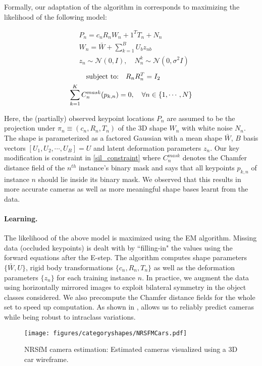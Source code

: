 Formally, our adaptation of the \nrsfm algorithm in \cite{Torresani2008NRSFM} corresponds to maximizing the likelihood of the following model:

\begin{equation}
\begin{aligned}
&{P_{n}} = c_nR_nW_{n} + 1^TT_{n} + N_{n}\\
&W_n = \bar{W} + \sum\limits_{k=1}^B U_b z_{nb} \\
&z_n \sim \mathcal{N}(0,I), \quad N^k_{n}\sim \mathcal{N}(0,\sigma^2 I)
\end{aligned}
\end{equation}
\begin{align}
\text{subject to:}\nonumber &\quad R_nR_{n}^{T} = I_2 \\
\eqlabel{sil_constraint}
\sum\limits_{k=1}^K C_{n}^{mask}(p_{k,n}) &= 0, \quad \forall n\in \{1,\cdots,N\}
\end{align}

Here, the (partially) observed keypoint locations $P_n$ are assumed to be the projection under $\pi_n \equiv (c_n, R_n, T_n)$ of the 3D shape $W_n$ with white noise $N_n$. The shape is parameterized as a factored Gaussian with a mean shape $\bar{W}$, $B$ basis vectors $[U_1,U_2, \cdots,U_B] = U$ and latent deformation parameters $z_n$. Our key modification is constraint in \eqref{sil_constraint} where $C_{n}^{mask}$ denotes the Chamfer distance field of the $n^{th}$ instance's binary mask and says that all keypoints $p_{k,n}$ of instance $n$ should lie inside its binary mask. We observed that this results in more accurate cameras as well as more meaningful shape bases learnt from the data.

\paragraph{Learning.} The likelihood of the above model is maximized using the EM algorithm. Missing data (occluded keypoints) is dealt with by ``filling-in" the values using the forward equations after the E-step. The algorithm computes shape parameters $\{\bar{W},U\}$, rigid body transformations $\{c_n,R_n,T_n\}$ as well as the deformation parameters $\{z_n\}$ for each training instance $n$. In practice, we augment the data using horizontally mirrored images to exploit bilateral symmetry in the object classes considered. We also precompute the Chamfer distance fields for the whole set to speed up computation. As shown in , \nrsfm  allows us to reliably predict cameras while being robust to intraclass variations.

\begin{figure}[htb!]
  \centering
\texttt{[image: figures/categoryshapes/NRSFMCars.pdf]}
\caption{NRSfM camera estimation: Estimated cameras visualized using a 3D car wireframe.}
\end{figure}
